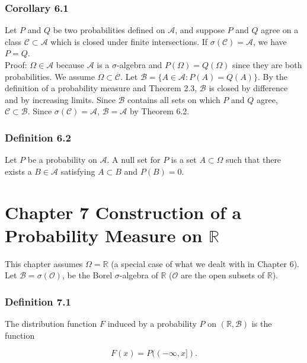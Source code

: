 \documentclass{article}
\begin{document}
{\subsubsection*{Corollary 6.1}

Let $P$ and $Q$ be two probabilities defined on $\mathcal{A}$, and suppose $P$ and $Q$ agree on a class $\mathcal{C} \subset \mathcal{A}$ which is closed under finite intersections. If $\sigma(\mathcal{C}) = \mathcal{A}$, we have $P = Q$. \\

Proof: $\Omega \in \mathcal{A}$ because $\mathcal{A}$ is a $\sigma$-algebra and $P(\Omega) = Q(\Omega)$ since they are both probabilities. We assume $\Omega \subset \mathcal{C}$. Let $\mathcal{B} = \{A \in \mathcal{A} : P(A) = Q(A)\}$. By the definition of a probability measure and Theorem 2.3, $\mathcal{B}$ is closed by difference and by increasing limits. Since $\mathcal{B}$ contains all sets on which $P$ and $Q$ agree, $\mathcal{C}\subset \mathcal{B}$. Since $\sigma(\mathcal{C}) = \mathcal{A}$, $\mathcal{B} = \mathcal{A}$ by Theorem 6.2.



\subsubsection*{Definition 6.2}

Let $P$ be a probability on $\mathcal{A}$. A null set for $P$ is a set $A \subset \Omega$ such that there exists a $B \in \mathcal{A}$ satisfying $A \subset B$ and $P(B) = 0$. 


\newpage
\section*{Chapter 7 Construction of a Probability Measure on $\mathbb{R}$}

This chapter assumes $\Omega = \mathbb{R}$ (a special case of what we dealt with in Chapter 6). Let $\mathcal{B} = \sigma(\mathcal{O})$, be the Borel $\sigma$-algebra of $\mathbb{R}$ ($\mathcal{O}$ are the open subsets of $\mathbb{R}$). 

\subsubsection*{Definition 7.1}

The distribution function $F$ induced by a probability $P$ on $(\mathbb{R}, \mathcal{B})$ is the function 

$$
F(x) = P((-\infty , x]).
$$

}
\end{document}
